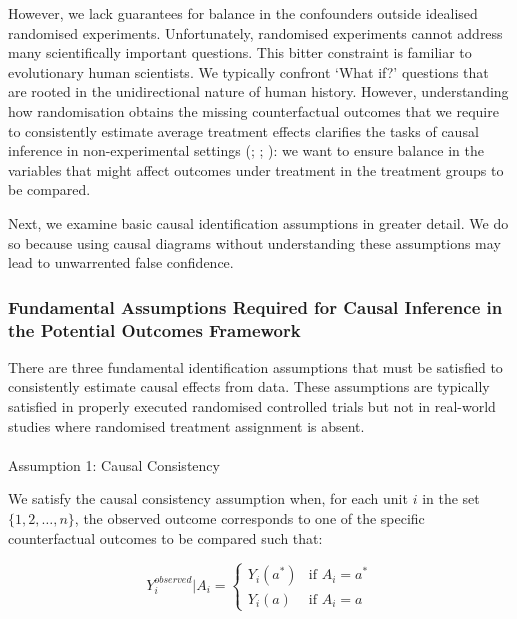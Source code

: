 \documentclass[
  single column]{article}
\makeatletter
\let\oldparagraph\paragraph
\renewcommand{\paragraph}{
    \@ifstar
      \xxxParagraphStar
      \xxxParagraphNoStar
  }
\newcommand{\xxxParagraphStar}[1]{\oldparagraph*{#1}\mbox{}}
\newcommand{\xxxParagraphNoStar}[1]{\oldparagraph{#1}\mbox{}}
\makeatother
\begin{document}
However, we lack guarantees for balance in the confounders outside
idealised randomised experiments. Unfortunately, randomised experiments
cannot address many scientifically important questions. This bitter
constraint is familiar to evolutionary human scientists. We typically
confront `What if?' questions that are rooted in the unidirectional
nature of human history. However, understanding how randomisation
obtains the missing counterfactual outcomes that we require to
consistently estimate average treatment effects clarifies the tasks of
causal inference in non-experimental settings
(;
;
): we want to
ensure balance in the variables that might affect outcomes under
treatment in the treatment groups to be compared.

Next, we examine basic causal identification assumptions in greater
detail. We do so because using causal diagrams without understanding
these assumptions may lead to unwarrented false confidence.

\subsubsection{Fundamental Assumptions Required for Causal Inference in
the Potential Outcomes
Framework}\label{fundamental-assumptions-required-for-causal-inference-in-the-potential-outcomes-framework}

There are three fundamental identification assumptions that must be
satisfied to consistently estimate causal effects from data. These
assumptions are typically satisfied in properly executed randomised
controlled trials but not in real-world studies where randomised
treatment assignment is absent.

\paragraph{Assumption 1: Causal
Consistency}\label{assumption-1-causal-consistency}

We satisfy the causal consistency assumption when, for each unit \(i\)
in the set \(\{1, 2, \ldots, n\}\), the observed outcome corresponds to
one of the specific counterfactual outcomes to be compared such that:

\[
Y_i^{observed}|A_i = 
\begin{cases} 
Y_i(a^*) & \text{if } A_i = a^* \\
Y_i(a) & \text{if } A_i = a
\end{cases}
\]
\end{document}
